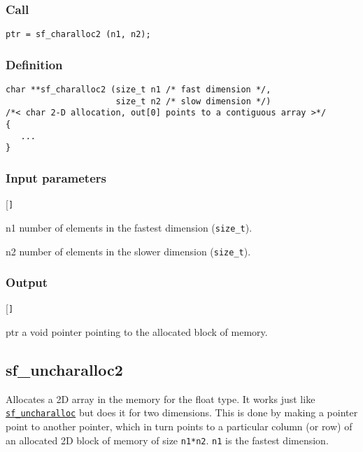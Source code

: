 \subsubsection*{Call}
\begin{verbatim}ptr = sf_charalloc2 (n1, n2);\end{verbatim}

\subsubsection*{Definition}
\begin{verbatim}
char **sf_charalloc2 (size_t n1 /* fast dimension */, 
                      size_t n2 /* slow dimension */) 
/*< char 2-D allocation, out[0] points to a contiguous array >*/
{
   ...
}
\end{verbatim}
\subsubsection*{Input parameters}
\begin{desclist}{\tt }{\quad}[\tt ]
   \setlength\itemsep{0pt}
   \item[n1] number of elements in the fastest dimension (\texttt{size\_t}).
   \item[n2] number of elements in the slower dimension (\texttt{size\_t}).
\end{desclist}

\subsubsection*{Output}
\begin{desclist}{\tt }{\quad}[\tt ]
   \setlength\itemsep{0pt}
   \item[ptr] a void pointer pointing to the allocated block of memory.
\end{desclist}




\subsection{{sf\_uncharalloc2}}\label{sec:sf_uncharalloc2}
Allocates a 2D array in the memory for the float type. It works just like \hyperref[sec:sf_ucharalloc]{\texttt{sf\_uncharalloc}} but does it for two dimensions. This is done by making a pointer point to another pointer, which in turn points to a particular column (or row) of an allocated 2D block of memory of size \texttt{n1*n2}. \texttt{n1} is the fastest dimension.

